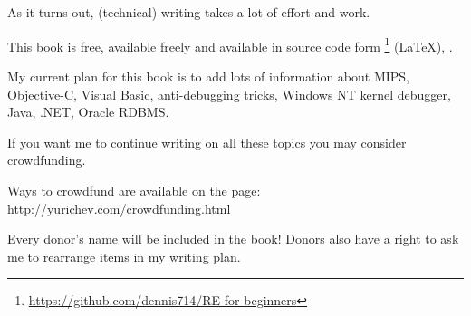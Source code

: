 \section{}

{As it turns out, (technical) writing takes a lot of effort and work}.

{This book is free, available freely and available in source code form}
\footnote{\url{https://github.com/dennis714/RE-for-beginners}} (LaTeX), 
.

{My current plan for this book is to add lots of information about} MIPS, Objective-C, 
Visual Basic, anti-debugging tricks, Windows NT kernel debugger, Java, .NET, Oracle RDBMS.

{If you want me to continue writing on all these topics you may consider crowdfunding}.

{Ways to crowdfund are available on the page:} \url{http://yurichev.com/crowdfunding.html}

{Every donor's name will be included in the book}!
{Donors also have a right to ask me to rearrange items in my writing plan}.

